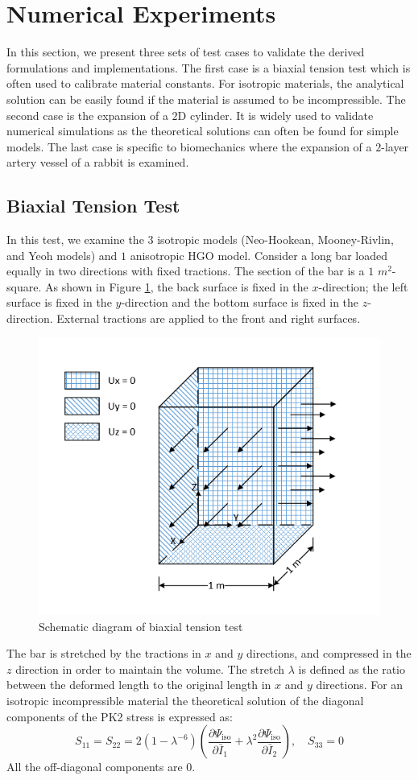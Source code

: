 \section{Numerical Experiments}
\label{experiments}
In this section, we present three sets of test cases to validate the derived formulations and implementations. The first case is a biaxial tension test which is often used to calibrate material constants. For isotropic materials, the analytical solution can be easily found if the material is assumed to be incompressible. The second case is the expansion of a $2$D cylinder. It is widely used to validate numerical simulations as the theoretical solutions can often be found for simple models. The last case is specific to biomechanics where the expansion of a $2$-layer artery vessel of a rabbit is examined.

\subsection{Biaxial Tension Test}
\label{biaxial_tension_test}
In this test, we examine the $3$ isotropic models (Neo-Hookean, Mooney-Rivlin, and Yeoh models) and $1$ anisotropic HGO model. Consider a long bar loaded equally in two directions with fixed tractions. The section of the bar is a $1$ $m^2$-square. As shown in Figure \ref{fig:biaxial_schematic}, the back surface is fixed in the $x$-direction; the left surface is fixed in the $y$-direction and the bottom surface is fixed in the $z$-direction. External tractions are applied to the front and right surfaces. 

\begin{figure}[H]
\centering
\includegraphics[width=.5\textwidth]{./figures/biaxial_schematic.png}
\caption{Schematic diagram of biaxial tension test}
\label{fig:biaxial_schematic}
\end{figure}

The bar is stretched by the tractions in $x$ and $y$ directions, and compressed in the $z$ direction in order to maintain the volume. The stretch $\lambda$ is defined as the ratio between the deformed length to the original length in $x$ and $y$ directions. For an isotropic incompressible material the theoretical solution of the diagonal components of the PK2 stress is expressed as:
\begin{equation} \label{biaxialPK2}
S_{11} = S_{22} = 2(1 - {\lambda}^{-6})\left(\frac{\partial\Psi_\mathrm{iso}}{\partial\bar{I}_1} + {\lambda}^2\frac{\partial\Psi_\mathrm{iso}}{\partial\bar{I}_2}\right), \quad S_{33} = 0
\end{equation}
All the off-diagonal components are $0$.

